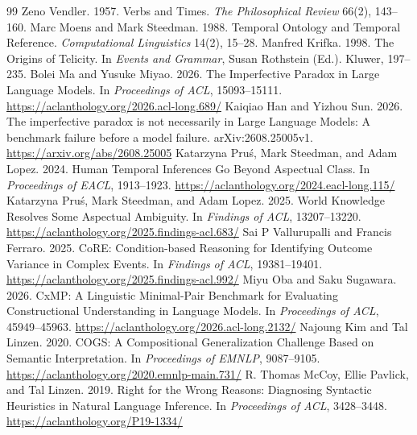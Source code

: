 \documentclass[sigconf,anonymous,review]{acmart}
\begin{document}
\begin{thebibliography}{99}
 Zeno Vendler. 1957. Verbs and Times. \emph{The Philosophical Review} 66(2), 143--160.
 Marc Moens and Mark Steedman. 1988. Temporal Ontology and Temporal Reference. \emph{Computational Linguistics} 14(2), 15--28.
 Manfred Krifka. 1998. The Origins of Telicity. In \emph{Events and Grammar}, Susan Rothstein (Ed.). Kluwer, 197--235.
 Bolei Ma and Yusuke Miyao. 2026. The Imperfective Paradox in Large Language Models. In \emph{Proceedings of ACL}, 15093--15111. \url{https://aclanthology.org/2026.acl-long.689/}
 Kaiqiao Han and Yizhou Sun. 2026. The imperfective paradox is not necessarily in Large Language Models: A benchmark failure before a model failure. arXiv:2608.25005v1. \url{https://arxiv.org/abs/2608.25005}
 Katarzyna Pru\'{s}, Mark Steedman, and Adam Lopez. 2024. Human Temporal Inferences Go Beyond Aspectual Class. In \emph{Proceedings of EACL}, 1913--1923. \url{https://aclanthology.org/2024.eacl-long.115/}
 Katarzyna Pru\'{s}, Mark Steedman, and Adam Lopez. 2025. World Knowledge Resolves Some Aspectual Ambiguity. In \emph{Findings of ACL}, 13207--13220. \url{https://aclanthology.org/2025.findings-acl.683/}
 Sai P Vallurupalli and Francis Ferraro. 2025. CoRE: Condition-based Reasoning for Identifying Outcome Variance in Complex Events. In \emph{Findings of ACL}, 19381--19401. \url{https://aclanthology.org/2025.findings-acl.992/}
 Miyu Oba and Saku Sugawara. 2026. CxMP: A Linguistic Minimal-Pair Benchmark for Evaluating Constructional Understanding in Language Models. In \emph{Proceedings of ACL}, 45949--45963. \url{https://aclanthology.org/2026.acl-long.2132/}
 Najoung Kim and Tal Linzen. 2020. COGS: A Compositional Generalization Challenge Based on Semantic Interpretation. In \emph{Proceedings of EMNLP}, 9087--9105. \url{https://aclanthology.org/2020.emnlp-main.731/}
 R. Thomas McCoy, Ellie Pavlick, and Tal Linzen. 2019. Right for the Wrong Reasons: Diagnosing Syntactic Heuristics in Natural Language Inference. In \emph{Proceedings of ACL}, 3428--3448. \url{https://aclanthology.org/P19-1334/}
\end{thebibliography}
\end{document}
